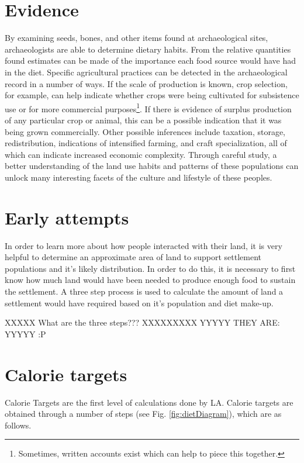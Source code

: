 \section{Evidence} \label{sec:Evidence} By examining seeds, bones, and other
items found at archaeological sites, archaeologists are able to determine 
dietary habits. From the relative quantities found estimates can be made of the
importance each food source would have had in the diet.  Specific agricultural practices
can be detected in the archaeological record in a number of ways.  If the scale
of production is known, crop selection, for example, can help indicate whether
crops were being cultivated for subsistence use or for more commercial
purposes\footnote{Sometimes, written accounts exist which can help to
piece this together.}.  If there is evidence of surplus production of any
particular crop or animal, this can be a possible indication that it was being
grown commercially.  Other possible inferences include taxation, storage,
redistribution, indications of intensified farming, and craft specialization,
all of which can indicate increased economic complexity.  Through careful
study, a better understanding of the land use habits and patterns of these
populations can unlock many interesting facets of the culture and lifestyle of
these peoples.

\section{Early attempts} \label{sec:EarlyAttempts} 

In order to learn more about how people interacted with their land, it is very
helpful to determine an approximate area of land to support settlement
populations and it's likely distribution.  In order to do this, it is necessary
to first know how much land would have been needed to produce enough food to
sustain the settlement.  A three step process is used to calculate the amount of
land a settlement would have required based on it's population and diet
make-up.  

XXXXX What are the three steps???  XXXXXXXXX
YYYYY THEY ARE:  YYYYY :P

\section{Calorie targets}
  Calorie Targets are the first level of calculations done by LA.  Calorie targets are obtained through a number of steps (see Fig. \ref{fig:dietDiagram}), which are as follows.

